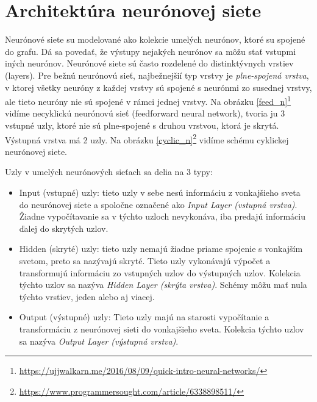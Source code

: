 \section{Architektúra neurónovej siete}
Neurónové siete su modelované ako kolekcie umelých neurónov, ktoré su spojené do grafu. Dá sa povedať, že výstupy nejakých neurónov sa môžu stať vstupmi iných neurónov. Neurónové siete sú často rozdelené do distinktývnych vrstiev (layers). Pre bežnú neurónovú sieť, najbežnejšií typ vrstvy je \emph{plne-spojená vrstva}, v ktorej všetky neuróny z každej vrstvy sú spojené s neurónmi zo susednej vrstvy, ale tieto neuróny nie sú spojené v rámci jednej vrstvy. Na obrázku \ref{feed_n}\footnote{\url{https://ujjwalkarn.me/2016/08/09/quick-intro-neural-networks/}} vidíme necyklickú neurónovú sieť (feedforward neural network), tvoria ju 3 vstupné uzly, ktoré nie sú plne-spojené s druhou vrstvou, ktorá je skrytá. Výstupná vrstva má 2 uzly. Na obrázku \ref{cyclic_n}\footnote{\url{https://www.programmersought.com/article/6338898511/}} vidíme schému cyklickej neurónovej siete.\cite{karn}\par
Uzly v umelých neurónových sieťach sa delia na 3 typy:
\begin{itemize}
    \item Input (vstupné) uzly: tieto uzly v sebe nesú informáciu z vonkajšieho sveta do neurónovej siete a spoločne označené ako \emph{Input Layer (vstupná vrstva)}. Žiadne vypočítavanie sa v týchto uzloch nevykonáva, iba predajú informáciu ďalej do skrytých uzlov.
    \item Hidden (skryté) uzly: tieto uzly nemajú žiadne priame spojenie s vonkajším svetom, preto sa nazývajú skryté. Tieto uzly vykonávajú výpočet a transformujú informáciu zo vstupných uzlov do výstupných uzlov. Kolekcia týchto uzlov sa nazýva \emph{Hidden Layer (skrýta vrstva)}. Schémy môžu mať nula týchto vrstiev, jeden alebo aj viacej. 
    \item Output (výstupné) uzly: Tieto uzly majú na starosti vypočítanie a transformáciu z neurónovej sieti do vonkajšieho sveta. Kolekcia týchto uzlov sa nazýva \emph{Output Layer (výstupná vrstva)}.
\end{itemize}\cite{karn}\par



